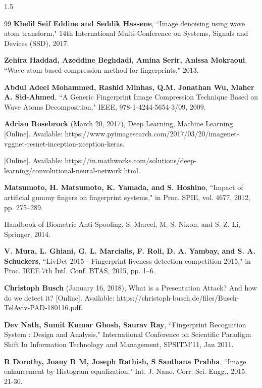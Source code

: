 \begin{spacing}{1.5}
\begin{thebibliography}{99}
 \textbf{Khelil Seif Eddine and Seddik Hassene}, ``Image denoising using wave atom transform," 14th International Multi-Conference on Systems, Signals and Devices (SSD), 2017.

 \textbf{Zehira Haddad, Azeddine Beghdadi, Amina Serir, Anissa Mokraoui}, ``Wave atom based compression method for fingerprints," 2013.

 \textbf{Abdul Adeel Mohammed, Rashid Minhas, Q.M. Jonathan Wu, Maher A. Sid-Ahmed}, ``A Generic Fingerprint Image Compression Technique Based on Wave Atoms Decomposition," IEEE, 978-1-4244-5654-3/09, 2009.

 \textbf{Adrian Rosebrock} (March 20, 2017), Deep Learning, Machine Learning [Online]. Available: https://www.pyimagesearch.com/2017/03/20/imagenet-vggnet-resnet-inception-xception-keras.

 [Online]. Available: https://in.mathworks.com/solutions/deep-learning/convolutional-neural-network.html.

 \textbf{Matsumoto, H. Matsumoto, K. Yamada, and S. Hoshino}, ``Impact
of artificial gummy fingers on fingerprint systems,"  in Proc. SPIE, vol. 4677, 2012, pp. 275–289.

 Handbook of Biometric Anti-Spoofing, S. Marcel, M. S. Nixon, and S. Z. Li, Springer, 2014.

 \textbf{V. Mura, L. Ghiani, G. L. Marcialis, F. Roli, D. A. Yambay, and S. A.
Schuckers}, ``LivDet 2015 - Fingerprint liveness detection competition 2015," in Proc. IEEE 7th Intl. Conf. BTAS, 2015, pp. 1–6.

 \textbf{Christoph Busch} (January 16, 2018), What is a Presentation Attack? And how do we detect it? [Online]. Available: https://christoph-busch.de/files/Busch-TelAviv-PAD-180116.pdf.

 \textbf{Dev Nath, Sumit Kumar Ghosh, Saurav Ray}, ``Fingerprint Recognition System : Design and Analysis," International Conference on Scientific Paradigm Shift In Information Technology and Management, SPSITM'11, Jan 2011.

 \textbf{R Dorothy, Joany R M, Joseph Rathish, S Santhana Prabha}, ``Image enhancement by Histogram equalization," Int. J. Nano. Corr. Sci. Engg., 2015, 21-30. 

 \end{thebibliography}
\end{spacing}
	
\nocite{*}


